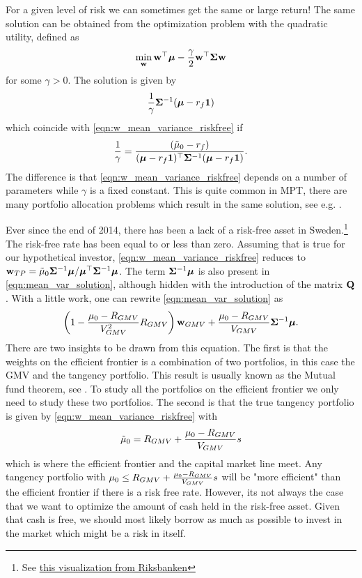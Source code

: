 \documentclass[oneside]{book}\usepackage{knitr}
\begin{document}
For a given level of risk we can sometimes get the same or large return! 
The same solution can be obtained from the optimization problem with the quadratic utility, defined as 
$$\min_{\mathbf{w}} \mathbf{w}^\top \mbox{\boldmath$\mu$} - \frac{\gamma}{2} \mathbf{w}^\top \mathbf{\Sigma} \mathbf{w}$$ 
for some $\gamma > 0$.
The solution is given by 
$$\frac{1}{\gamma}\mathbf{\Sigma}^{-1} (\mbox{\boldmath$\mu$}-r_f \mathbf{1})$$
which coincide with \eqref{eqn:w_mean_variance_riskfree} if 
$$\frac{1}{\gamma} = \frac{(\tilde\mu_0-r_f)}{(\mbox{\boldmath$\mu$}-r_f \mathbf{1})^\top \mathbf{\Sigma}^{-1} (\mbox{\boldmath$\mu$}-r_f \mathbf{1})}.$$ 
The difference is that \eqref{eqn:w_mean_variance_riskfree} depends on a number of parameters while $\gamma$ is a fixed constant.
This is quite common in MPT, there are many portfolio allocation problems which result in the same solution, see e.g. \citet{bodnar2013equivalence}.

Ever since the end of 2014, there has been a lack of a risk-free asset in Sweden.\footnote{See \href{https://www.riksbank.se/sv/statistik/sok-rantor--valutakurser/reporanta-in--och-utlaningsranta/}{this visualization from Riksbanken}} 
The risk-free rate has been equal to or less than zero. 
Assuming that is true for our hypothetical investor, \eqref{eqn:w_mean_variance_riskfree} reduces to $\mathbf{w}_{TP} = \tilde\mu_0 \mathbf{\Sigma}^{-1} \mbox{\boldmath$\mu$} / \mbox{\boldmath$\mu$}^\top \mathbf{\Sigma}^{-1} \mbox{\boldmath$\mu$}$. 
The term $\mathbf{\Sigma}^{-1} \mbox{\boldmath$\mu$}$ is also present in \eqref{eqn:mean_var_solution}, although hidden with the introduction of the matrix $\mathbf{Q}$. 
With a little work, one can rewrite \eqref{eqn:mean_var_solution} as
$$
\left(1 - \frac{\mu_0-R_{GMV}}{V_{GMV}^2} R_{GMV} \right) \mathbf{w}_{GMV} + \frac{\mu_0-R_{GMV}}{V_{GMV}} \mathbf{\Sigma}^{-1} \mbox{\boldmath$\mu$}.
$$
There are two insights to be drawn from this equation. 
The first is that the weights on the efficient frontier is a combination of two portfolios, in this case the GMV and the tangency portfolio. 
This result is usually known as the Mutual fund theorem, see \textcite{tobin1958liquidity}.
To study all the portfolios on the efficient frontier we only need to study these two portfolios. 
The second is that the true tangency portfolio is given by \eqref{eqn:w_mean_variance_riskfree} with 
$$
\tilde\mu_0 = R_{GMV} + \frac{\mu_0-R_{GMV}}{V_{GMV}} s  
$$
which is where the efficient frontier and the capital market line meet. 
Any tangency portfolio with $\mu_0\leq R_{GMV} + \frac{\mu_0-R_{GMV}}{V_{GMV}} s$ will be "more efficient" than the efficient frontier if there is a risk free rate. 
However, its not always the case that we want to optimize the amount of cash held in the risk-free asset. 
Given that cash is free, we should most likely borrow as much as possible to invest in the market which might be a risk in itself.
\end{document}

